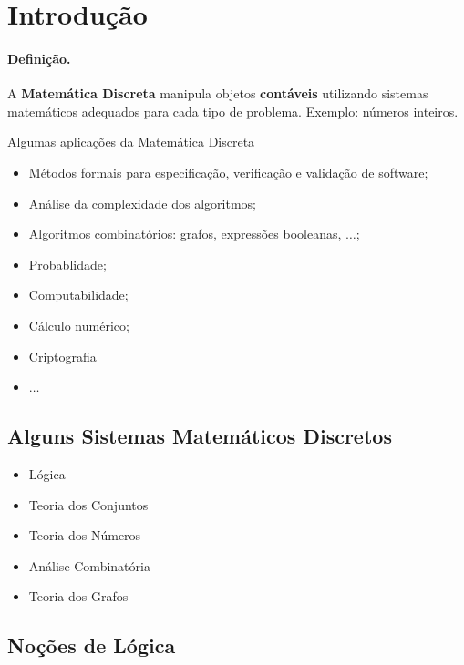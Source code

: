 \section*{Introdução}

\paragraph{Definição.} A \textbf{Matemática Discreta} manipula objetos \textbf{contáveis}
utilizando sistemas matemáticos adequados para cada tipo de problema.
Exemplo: números inteiros.

Algumas aplicações da Matemática Discreta

\begin{itemize}
\item
  Métodos formais para especificação, verificação e validação de
  software;
\item
  Análise da complexidade dos algoritmos;
\item
  Algoritmos combinatórios: grafos, expressões booleanas, \(\dots\);
\item
  Probablidade;
\item
  Computabilidade;
\item
  Cálculo numérico;
\item
  Criptografia
\item
  \(\dots\)
\end{itemize}

    \hypertarget{alguns-sistemas-matemuxe1ticos-discretos}{%
\subsection*{Alguns Sistemas Matemáticos
Discretos}\label{alguns-sistemas-matemuxe1ticos-discretos}}

\begin{itemize}
\item
  Lógica
\item
  Teoria dos Conjuntos
\item
  Teoria dos Números
\item
  Análise Combinatória
\item
  Teoria dos Grafos
\end{itemize}



    \hypertarget{nouxe7uxf5es-de-luxf3gica}{%
\subsection{Noções de Lógica}\label{nouxe7uxf5es-de-luxf3gica}}


